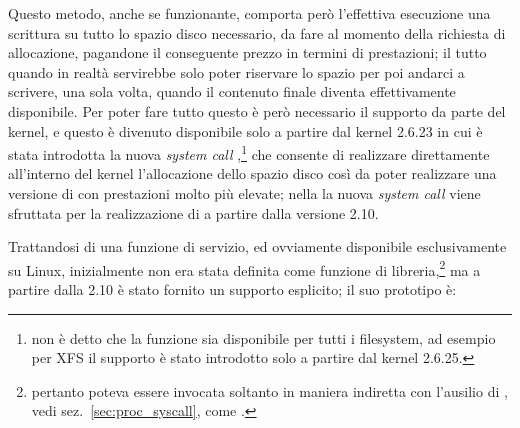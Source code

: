 Questo metodo, anche se funzionante, comporta però l'effettiva esecuzione una
scrittura su tutto lo spazio disco necessario, da fare al momento della
richiesta di allocazione, pagandone il conseguente prezzo in termini di
prestazioni; il tutto quando in realtà servirebbe solo poter riservare lo
spazio per poi andarci a scrivere, una sola volta, quando il contenuto finale
diventa effettivamente disponibile.  Per poter fare tutto questo è però
necessario il supporto da parte del kernel, e questo è divenuto disponibile
solo a partire dal kernel 2.6.23 in cui è stata introdotta la nuova
\textit{system call} ,\footnote{non è detto che la funzione
  sia disponibile per tutti i filesystem, ad esempio per XFS il supporto è
  stato introdotto solo a partire dal kernel 2.6.25.}  che consente di
realizzare direttamente all'interno del kernel l'allocazione dello spazio
disco così da poter realizzare una versione di  con
prestazioni molto più elevate; nella  la nuova \textit{system call}
viene sfruttata per la realizzazione di  a partire
dalla versione 2.10.

Trattandosi di una funzione di servizio, ed ovviamente disponibile
esclusivamente su Linux, inizialmente  non era stata definita
come funzione di libreria,\footnote{pertanto poteva essere invocata soltanto
  in maniera indiretta con l'ausilio di , vedi
  sez.~\ref{sec:proc_syscall}, come .} ma a partire dalla  2.10 è
  stato fornito un supporto esplicito; il suo prototipo è:

